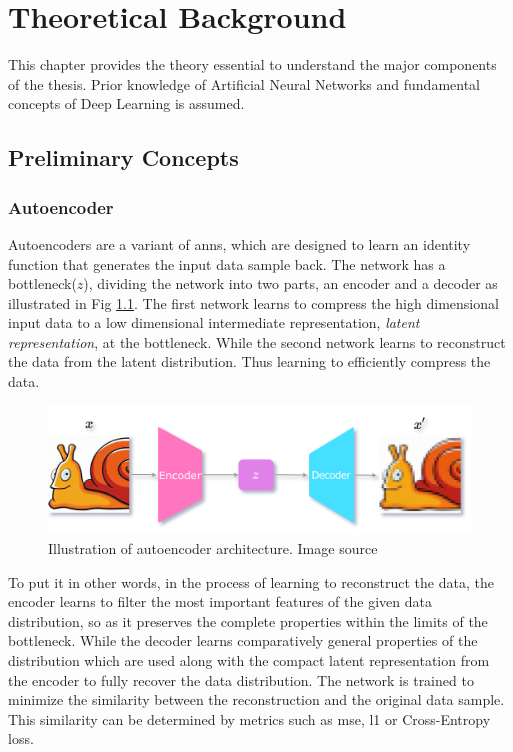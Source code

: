\chapter{Theoretical Background}
\label{chap:background}

This chapter provides the theory essential to understand the major components of the thesis. Prior knowledge of Artificial Neural Networks \cite{theory_ann_wiki} and fundamental concepts of Deep Learning \cite{theory_dl} is assumed.

\section{Preliminary Concepts}
\label{sec:Preliminary}

\subsection{Autoencoder}
Autoencoders are a variant of \acp{ann}, which are designed to learn an identity function that generates the input data sample back. The network has a bottleneck($z$), dividing the network into two parts, an encoder and a decoder as illustrated in Fig \ref{fig:ae_arch}. The first network learns to compress the high dimensional input data to a low dimensional intermediate representation, \textit{latent representation}, at the bottleneck. While the second network learns to reconstruct the data from the latent distribution. Thus learning to efficiently compress the data.

\begin{figure}[h]
    \centering
    \includegraphics[scale=0.2]{figures/arch/ae_arch.png}
    \caption{Illustration of autoencoder architecture. Image source \cite{deepimageprior}}
    \label{fig:ae_arch}
\end{figure}

To put it in other words, in the process of learning to reconstruct the data, the encoder learns to filter the most important features of the given data distribution, so as it preserves the complete properties within the limits of the bottleneck. While the decoder learns comparatively general properties of the distribution which are used along with the compact latent representation from the encoder to fully recover the data distribution. The network is trained to minimize the similarity between the reconstruction and the original data sample. This similarity can be determined by metrics such as \ac{mse}, \ac{l1} or Cross-Entropy loss.


